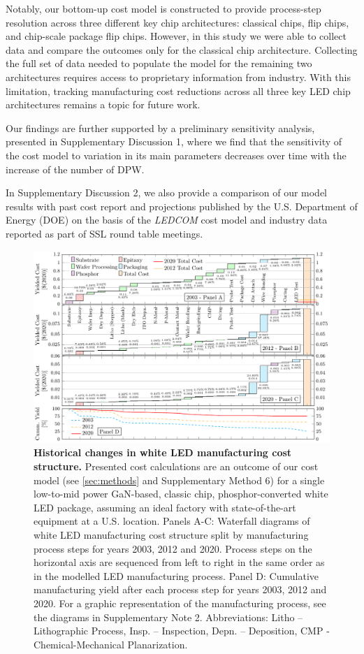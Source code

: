 \documentclass[parskip=full]{article}
\begin{document}
Notably, our bottom-up cost model is constructed to provide process-step resolution across three different key chip architectures: classical chips, flip chips, and chip-scale package flip chips. However, in this study we were able to collect data and compare the outcomes only for the classical chip architecture. Collecting the full set of data needed to populate the model for the remaining two architectures requires access to proprietary information from industry. With this limitation, tracking manufacturing cost reductions across all three key LED chip architectures remains a topic for future work.

Our findings are further supported by a preliminary sensitivity analysis, presented in Supplementary Discussion 1, where we find that the sensitivity of the cost model to variation in its main parameters decreases over time with the increase of the number of DPW. 

In Supplementary Discussion 2, we also provide a comparison of our model results with past cost report and projections published by the U.S. Department of Energy (DOE) on the basis of the \textit{LEDCOM} cost model \cite{ledcomv2} and industry data reported as part of SSL round table meetings.

\begin{figure}[ht!]
\centering
\includegraphics[width=17.5cm]{figures/costmodel_results_years.pdf}
\caption{\textbf{Historical changes in white LED manufacturing cost structure.} Presented cost calculations are an outcome of our cost model (see \cref{sec:methods} and Supplementary Method 6) for a single low-to-mid power GaN-based, classic chip, phosphor-converted white LED package, assuming an ideal factory with state-of-the-art equipment at a U.S. location. Panels A-C: Waterfall diagrams of white LED manufacturing cost structure split by manufacturing process steps for years 2003, 2012 and 2020. Process steps on the horizontal axis are sequenced from left to right in the same order as in the modelled LED manufacturing process. Panel D: Cumulative manufacturing yield after each process step for years 2003, 2012 and 2020. For a graphic representation of the manufacturing process, see the diagrams in Supplementary Note 2. Abbreviations: Litho – Lithographic Process, Insp. – Inspection, Depn. – Deposition, CMP - Chemical-Mechanical Planarization.}
\label{fgr:costmodel}
\end{figure}
\end{document}
